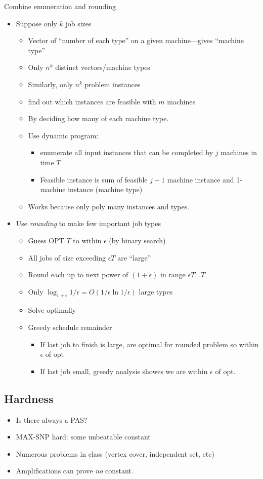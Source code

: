 \documentclass{article}
\begin{document}
Combine enumeration and rounding
\begin{itemize}
\item Suppose only $k$ job sizes
\begin{itemize}
\item Vector of ``number of each type'' on a given machine---gives
  ``machine type''
\item Only $n^k$ distinct vectors/machine types
\item Similarly, only $n^k$ problem instances
\item find out which instances are feasible with $m$ machines
\item By deciding how many of each machine type.
\item Use dynamic program: 
\begin{itemize}
\item enumerate all input instances that can be
  completed by $j$ machines in time $T$
\item Feasible instance is sum of feasible $j-1$ machine instance and 1-machine
  instance (machine type)
\end{itemize}
\item Works because only poly many instances and types.
\end{itemize}
\item Use \emph{rounding} to make few important job types
\begin{itemize}
\item Guess OPT $T$ to within $\epsilon$ (by binary search)
\item All jobs of size exceeding $\epsilon T$ are ``large''
\item Round each up to next power of $(1+\epsilon)$ in range $\epsilon  T \ldots T$
\item Only $\log_{1+\epsilon}1/\epsilon = O(1/\epsilon \ln 1/\epsilon)$ large types
\item Solve optimally
\item Greedy schedule remainder
\begin{itemize}
\item If last job to finish is large, are optimal for rounded problem so within
  $\epsilon$ of opt
\item If last job small, greedy analysis showes we are within
  $\epsilon$ of opt.
\end{itemize}
\end{itemize}
\end{itemize}

\subsection*{Hardness}
\begin{itemize}
\item Is there always a PAS?
\item MAX-SNP hard: some unbeatable constant
\item Numerous problems in class (vertex cover, independent set, etc)
\item Amplifications can prove \emph{no} constant.
\end{itemize}
\end{document}
